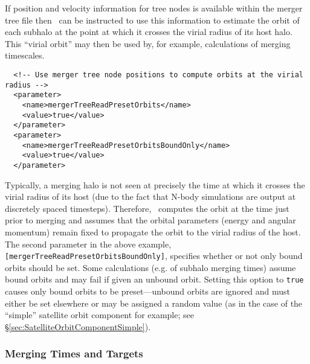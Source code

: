 If position and velocity information for tree nodes is available within the merger tree file then \glc\ can be instructed to use this information to estimate the orbit of each subhalo at the point at which it crosses the virial radius of its host halo. This ``virial orbit'' may then be used by, for example, calculations of merging timescales.
\begin{verbatim}
  <!-- Use merger tree node positions to compute orbits at the virial radius -->
  <parameter>
    <name>mergerTreeReadPresetOrbits</name>
    <value>true</value>
  </parameter>
  <parameter>
    <name>mergerTreeReadPresetOrbitsBoundOnly</name>
    <value>true</value>
  </parameter>
\end{verbatim}
Typically, a merging halo is not seen at precisely the time at which it crosses the virial radius of its host (due to the fact that N-body simulations are output at discretely spaced timesteps). Therefore, \glc\ computes the orbit at the time just prior to merging and assumes that the orbital parameters (energy and angular momentum) remain fixed to propagate the orbit to the virial radius of the host. The second parameter in the above example, {\tt [mergerTreeReadPresetOrbitsBoundOnly]}, specifies whether or not only bound orbits should be set. Some calculations (e.g. of subhalo merging times) assume bound orbits and may fail if given an unbound orbit. Setting this option to {\tt true} causes only bound orbits to be preset---unbound orbits are ignored and must either be set elsewhere or may be assigned a random value (as in the case of the ``simple'' satellite orbit component for example; see \S\ref{sec:SatelliteOrbitComponentSimple}).

\subsubsection{Merging Times and Targets}

